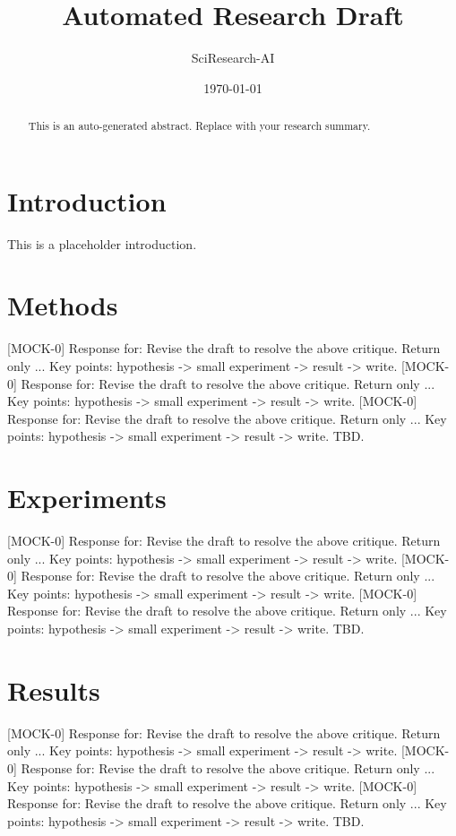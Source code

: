 \documentclass{article}
\title{Automated Research Draft}
\author{SciResearch-AI}
\date{\today}
\begin{document}
\maketitle

\begin{abstract}
This is an auto-generated abstract. Replace with your research summary.
\end{abstract}

\section{Introduction}
This is a placeholder introduction.

\section{Methods}
[MOCK-0] Response for: Revise the draft to resolve the above critique. Return only ...
Key points: hypothesis -> small experiment -> result -> write.
[MOCK-0] Response for: Revise the draft to resolve the above critique. Return only ...
Key points: hypothesis -> small experiment -> result -> write.
[MOCK-0] Response for: Revise the draft to resolve the above critique. Return only ...
Key points: hypothesis -> small experiment -> result -> write.
TBD.

\section{Experiments}
[MOCK-0] Response for: Revise the draft to resolve the above critique. Return only ...
Key points: hypothesis -> small experiment -> result -> write.
[MOCK-0] Response for: Revise the draft to resolve the above critique. Return only ...
Key points: hypothesis -> small experiment -> result -> write.
[MOCK-0] Response for: Revise the draft to resolve the above critique. Return only ...
Key points: hypothesis -> small experiment -> result -> write.
TBD.

\section{Results}
[MOCK-0] Response for: Revise the draft to resolve the above critique. Return only ...
Key points: hypothesis -> small experiment -> result -> write.
[MOCK-0] Response for: Revise the draft to resolve the above critique. Return only ...
Key points: hypothesis -> small experiment -> result -> write.
[MOCK-0] Response for: Revise the draft to resolve the above critique. Return only ...
Key points: hypothesis -> small experiment -> result -> write.
TBD.
\end{document}
